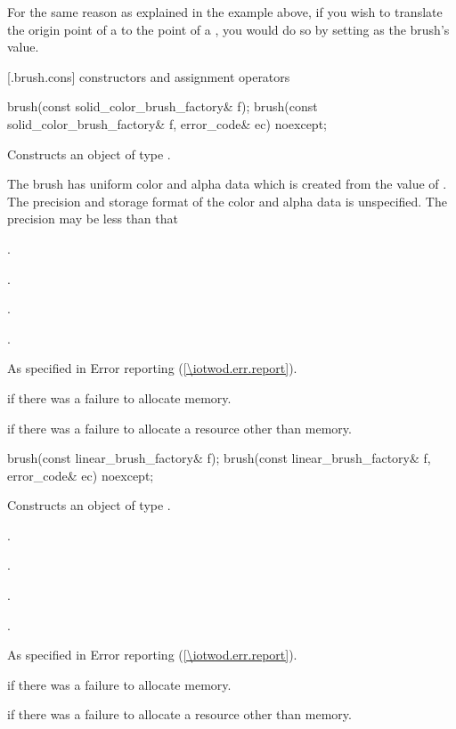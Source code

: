 \pnum
\enternote
For the same reason as explained in the example above, if you wish to translate the origin point of a  to the point  of a , you would do so by setting  as the brush's  value.
\exitnote

 [\iotwod.brush.cons] { constructors and assignment operators}

\begin{itemdecl}
    brush(const solid_color_brush_factory& f);
    brush(const solid_color_brush_factory& f, error_code& ec) noexcept;
\end{itemdecl}
\begin{itemdescr}
	\pnum
	\effects
	Constructs an object of type .
	
	\pnum
	The brush has uniform color and alpha data which is created from the value of . The precision and storage format of the color and alpha data is unspecified. The precision may be less than that  
	
	\pnum
	\postconditions
	.
	
	.
	
	.
	
	.

	\pnum
	\throws
	As specified in Error reporting (\ref{\iotwod.err.report}).
	
	\pnum
	\errors
	 if there was a failure to allocate memory.
	
	 if there was a failure to allocate a resource other than memory.
	
\end{itemdescr}

\begin{itemdecl}
    brush(const linear_brush_factory& f);
    brush(const linear_brush_factory& f, error_code& ec) noexcept;
\end{itemdecl}
\begin{itemdescr}
	\pnum
	\effects
	Constructs an object of type .
	
	\pnum
	\postconditions
	.
	
	.
	
	.
	
	.

	\pnum
	\throws
	As specified in Error reporting (\ref{\iotwod.err.report}).
	
	\pnum
	\errors
	 if there was a failure to allocate memory.
	
	 if there was a failure to allocate a resource other than memory.
	
\end{itemdescr}

